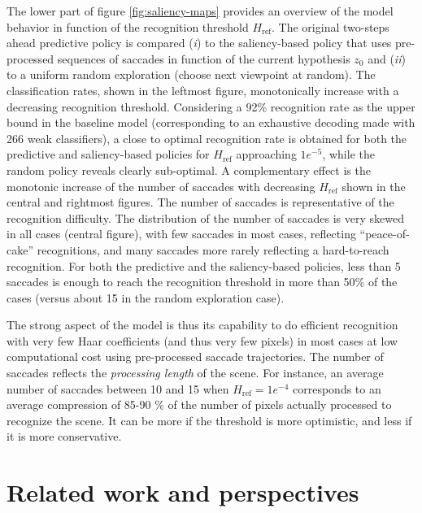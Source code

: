 \documentclass{article} %
\begin{document}
The lower part of figure \ref{fig:saliency-maps} provides an overview of the model behavior in function of the recognition threshold $H_\text{ref}$. The original two-steps ahead predictive policy is compared (\textit{i}) to the saliency-based policy that uses pre-processed sequences of saccades in function of the current hypothesis $z_0$ and (\textit{ii}) to a uniform random exploration (choose next viewpoint at random). The classification rates, shown in the leftmost figure, monotonically increase with a decreasing recognition threshold. Considering a 92\% recognition rate as the upper bound in the baseline model (corresponding to an exhaustive decoding made with 266 weak classifiers), a close to optimal recognition rate is obtained for both the predictive and saliency-based policies for $H_\text{ref}$ approaching $1e^{-5}$, while the random policy reveals clearly sub-optimal. A complementary effect is the monotonic increase of the number of saccades with decreasing $H_\text{ref}$ shown in the central and rightmost figures. The number of saccades is representative of the recognition difficulty. The distribution of the number of saccades is very skewed in all cases (central figure), with few saccades in most cases, reflecting ``peace-of-cake'' recognitions, and many saccades more rarely reflecting a hard-to-reach recognition. For both the predictive and the saliency-based policies, less than 5 saccades is enough to reach the recognition threshold in more than 50\% of the cases (versus about 15 in the random exploration case).  

The strong aspect of the model is thus its capability to do efficient recognition with very few Haar coefficients (and thus very few pixels) in most cases at low computational cost using pre-processed saccade trajectories. The number of saccades  reflects the \textit{processing length} of the scene.  
For instance, an average number of saccades between 10 and 15 when $H_\text{ref} = 1e^{-4}$ corresponds to an average compression of 85-90 \% of the number of pixels actually processed to recognize the scene. It can be more if the threshold is more optimistic, and less if it is more conservative.   

\section{Related work and perspectives}
\end{document}
